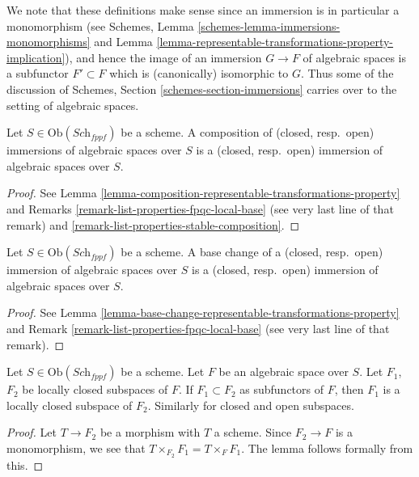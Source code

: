 \noindent
We note that these definitions make sense since an immersion
is in particular a monomorphism (see
Schemes, Lemma \ref{schemes-lemma-immersions-monomorphisms}
and Lemma \ref{lemma-representable-transformations-property-implication}),
and hence the image of an
immersion $G \to F$ of algebraic spaces is a subfunctor $F' \subset F$
which is (canonically) isomorphic to $G$. Thus some of the discussion
of Schemes, Section \ref{schemes-section-immersions} carries over to the
setting of algebraic spaces.

\begin{lemma}
\label{lemma-composition-immersions}
Let $S \in \text{Ob}(\textit{Sch}_{fppf})$ be a scheme.
A composition of (closed, resp.\ open) immersions of
algebraic spaces over $S$ is a (closed, resp.\ open)
immersion of algebraic spaces over $S$.
\end{lemma}

\begin{proof}
See Lemma \ref{lemma-composition-representable-transformations-property} and
Remarks \ref{remark-list-properties-fpqc-local-base} (see very last line of
that remark) and \ref{remark-list-properties-stable-composition}.
\end{proof}

\begin{lemma}
\label{lemma-base-change-immersions}
Let $S \in \text{Ob}(\textit{Sch}_{fppf})$ be a scheme.
A base change of a (closed, resp.\ open) immersion
of algebraic spaces over $S$ is a (closed, resp.\ open)
immersion of algebraic spaces over $S$.
\end{lemma}

\begin{proof}
See Lemma \ref{lemma-base-change-representable-transformations-property} and
Remark \ref{remark-list-properties-fpqc-local-base} (see very last line of
that remark).
\end{proof}

\begin{lemma}
\label{lemma-sub-subspaces}
Let $S \in \text{Ob}(\textit{Sch}_{fppf})$ be a scheme.
Let $F$ be an algebraic space over $S$. Let $F_1$, $F_2$ be
locally closed subspaces of $F$. If $F_1 \subset F_2$ as subfunctors
of $F$, then $F_1$ is a locally closed subspace of $F_2$.
Similarly for closed and open subspaces.
\end{lemma}

\begin{proof}
Let $T \to F_2$ be a morphism with $T$ a scheme.
Since $F_2 \to F$ is a monomorphism, we see that
$T \times_{F_2} F_1 = T \times_F F_1$. The lemma follows
formally from this.
\end{proof}

